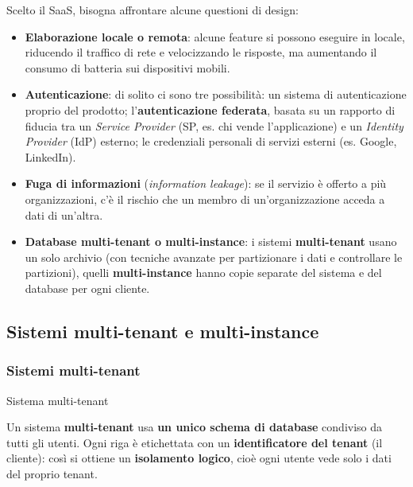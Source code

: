 Scelto il SaaS, bisogna affrontare alcune questioni di design:

\begin{itemize}
\tightlist
\item
  \textbf{Elaborazione locale o remota}: alcune feature si possono
  eseguire in locale, riducendo il traffico di rete e velocizzando le
  risposte, ma aumentando il consumo di batteria sui dispositivi mobili.
\item
  \textbf{Autenticazione}: di solito ci sono tre possibilità: un sistema
  di autenticazione proprio del prodotto; l'\textbf{autenticazione
  federata}, basata su un rapporto di fiducia tra un \emph{Service
  Provider} (SP, es. chi vende l'applicazione) e un \emph{Identity
  Provider} (IdP) esterno; le credenziali personali di servizi esterni
  (es. Google, LinkedIn).
\item
  \textbf{Fuga di informazioni} (\emph{information leakage}): se il
  servizio è offerto a più organizzazioni, c'è il rischio che un membro
  di un'organizzazione acceda a dati di un'altra.
\item
  \textbf{Database multi-tenant o multi-instance}: i sistemi
  \textbf{multi-tenant} usano un solo archivio (con tecniche avanzate
  per partizionare i dati e controllare le partizioni), quelli
  \textbf{multi-instance} hanno copie separate del sistema e del
  database per ogni cliente.
\end{itemize}

\subsection{Sistemi multi-tenant e
multi-instance}\label{sistemi-multi-tenant-e-multi-instance}

\subsubsection{Sistemi multi-tenant}\label{sistemi-multi-tenant}

\begin{boxdefinition}{Sistema multi-tenant}

Un sistema \textbf{multi-tenant} usa \textbf{un unico schema di
database} condiviso da tutti gli utenti. Ogni riga è etichettata con un
\textbf{identificatore del tenant} (il cliente): così si ottiene un
\textbf{isolamento logico}, cioè ogni utente vede solo i dati del
proprio tenant.

\end{boxdefinition}

